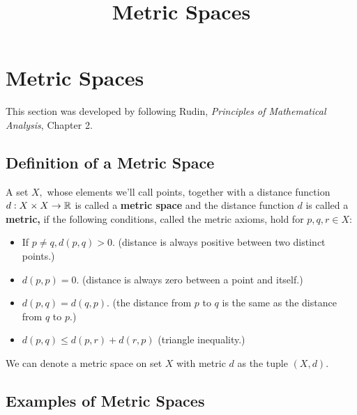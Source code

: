 \documentclass{article}
\title{Metric Spaces}
\begin{document}
\section{Metric Spaces}

\begin{note}\label{metric-spaces-reference-note}
This section was developed by following Rudin, \emph{Principles of Mathematical Analysis}, Chapter 2.
\end{note}

\subsection{Definition of a Metric Space}

\begin{definition}
A set $X,$ whose \@{elements} we'll call \@{points}, together with a distance \@{function} $d: X \times X \to \mathbb{R}$ is called a \textbf{metric space} and the distance function $d$ is called a \textbf{metric,} if the following conditions, called the metric axioms, hold for $p, q, r \in X:$

\begin{itemize}
\item If $p \neq q, d(p,q) > 0.$ (distance is always positive between two distinct points.)
\end{itemize}

\begin{itemize}
\item $d(p,p) = 0.$ (distance is always zero between a point and itself.)
\end{itemize}

\begin{itemize}
\item $d(p,q) = d(q,p).$ (the distance from $p$ to $q$ is the same as the distance from $q$ to $p$.)
\end{itemize}

\begin{itemize}
\item $d(p,q) \leq d(p,r) + d(r,p)$ (triangle inequality.)
\end{itemize}

We can denote a metric space on set $X$ with metric $d$ as the tuple $(X, d).$
\end{definition}

\subsection{Examples of Metric Spaces}
\end{document}
